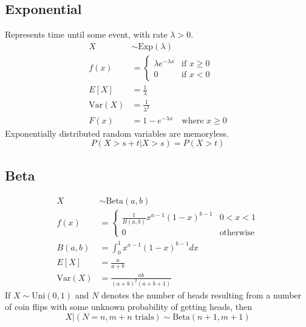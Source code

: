 \documentclass[12pt]{article}
\newcommand{\Sp}{\text{ }}
\newcommand{\Var}{\text{Var}}
\newcommand{\Exp}{\text{Exp}}
\newcommand{\Where}{\Sp\text{ where }}
\begin{document}
\subsection{Exponential}
Represents time until some event, with rate $\lambda > 0$.
\begin{align*}
    X& \sim \Exp(\lambda) \\
 f(x)& = \left\{
        \begin{array}{ll}
            \lambda e^{-\lambda x} &\text{if } x \geq 0 \\
                                 0 &\text{if } x < 0
        \end{array}
    \right. \\
    E[X]& = \frac{1}{\lambda} \\
 \Var(X)& = \frac{1}{\lambda^2} \\
    F(x)& = 1 - e^{-\lambda x} \Where x \geq 0
\end{align*}
Exponentially distributed random variables are memoryless.
$$P(X > s + t | X > s) = P(X > t)$$

\subsection{Beta}
\begin{align*}
    X& \sim \text{Beta}(a, b) \\
 f(x)& = \left\{
        \begin{array}{ll}
            \frac{1}{B(a,b)}x^{a-1}(1-x)^{b-1} &0 < x < 1 \\
                                             0 &\text{otherwise}
        \end{array}
    \right. \\
    B(a,b)& = \int_{0}^{1} x^{a-1} (1-x)^{b-1} dx \\
      E[X]& = \frac{a}{a+b} \\
   \Var(X)& = \frac{ab}{(a+b)^2(a+b+1)}
\end{align*}
If $X \sim \text{Uni}(0, 1)$ and $N$ denotes the number of heads resulting from a number of coin flips with some unknown probability of getting heads, then
$$X|(N = n, m+n \text{ trials}) \sim \text{Beta}(n + 1, m+ 1)$$
\end{document}
